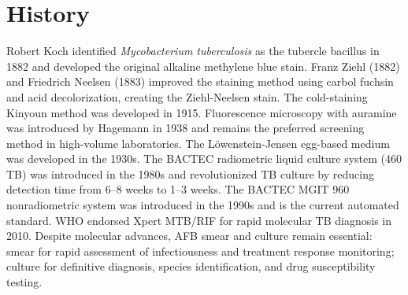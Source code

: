 \section*{History}
Robert Koch identified \textit{Mycobacterium tuberculosis} as the tubercle bacillus in 1882 and developed the original alkaline methylene blue stain. Franz Ziehl (1882) and Friedrich Neelsen (1883) improved the staining method using carbol fuchsin and acid decolorization, creating the Ziehl-Neelsen stain. The cold-staining Kinyoun method was developed in 1915. Fluorescence microscopy with auramine was introduced by Hagemann in 1938 and remains the preferred screening method in high-volume laboratories. The Löwenstein-Jensen egg-based medium was developed in the 1930s. The BACTEC radiometric liquid culture system (460 TB) was introduced in the 1980s and revolutionized TB culture by reducing detection time from 6--8 weeks to 1--3 weeks. The BACTEC MGIT 960 nonradiometric system was introduced in the 1990s and is the current automated standard. WHO endorsed Xpert MTB/RIF for rapid molecular TB diagnosis in 2010. Despite molecular advances, AFB smear and culture remain essential: smear for rapid assessment of infectiousness and treatment response monitoring; culture for definitive diagnosis, species identification, and drug susceptibility testing.

